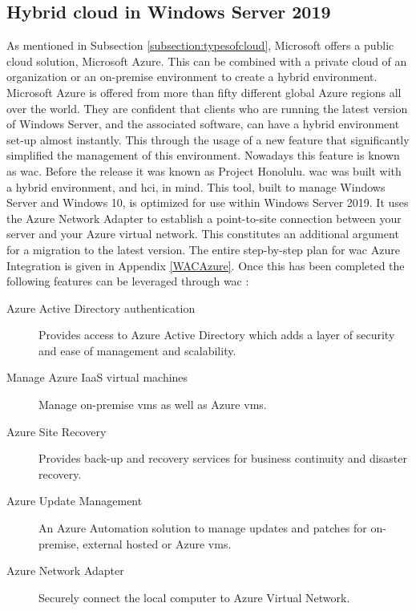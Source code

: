 \subsection{Hybrid cloud in Windows Server 2019}
\label{hybrid-cloud-windows-server-2019}
As mentioned in Subsection \ref{subsection:typesofcloud}, Microsoft offers a public cloud solution, Microsoft Azure. 
This can be combined with a private cloud of an organization or an on-premise environment to create a hybrid environment. 
Microsoft Azure is offered from more than fifty different global Azure regions all over the world. 
They are confident that clients who are running the latest version of Windows Server, and the associated software, can have a hybrid environment set-up almost instantly. 
This through the usage of a new feature that significantly simplified the management of this environment. 
Nowadays this feature is known as \acrfull{wac}. Before the release it was known as Project Honolulu. 
\acrlong{wac} was built with a hybrid environment, and \acrshort{hci}, in mind. 
This tool, built to manage Windows Server and Windows 10, is optimized for use within Windows Server 2019. 
It uses the Azure Network Adapter to establish a point-to-site connection between your server and your Azure virtual network. 
This constitutes an additional argument for a migration to the latest version. 
The entire step-by-step plan for \acrlong{wac} Azure Integration is given in Appendix \ref{WACAzure}. 
Once this has been completed the following features can be leveraged through \acrlong{wac} \autocite{Washburn2018}:

\begin{description}
\item [Azure Active Directory authentication] Provides access to Azure Active Directory which adds a layer of security and ease of management and scalability.
\item [Manage Azure IaaS virtual machines] Manage on-premise \acrshort{vm}s as well as Azure \acrshort{vm}s.
\item [Azure Site Recovery] Provides back-up and recovery services for business continuity and disaster recovery.
\item [Azure Update Management] An Azure Automation solution to manage updates and patches for on-premise, external hosted or Azure \acrshort{vm}s.
\item [Azure Network Adapter] Securely connect the local computer to Azure Virtual Network.
\end{description}

